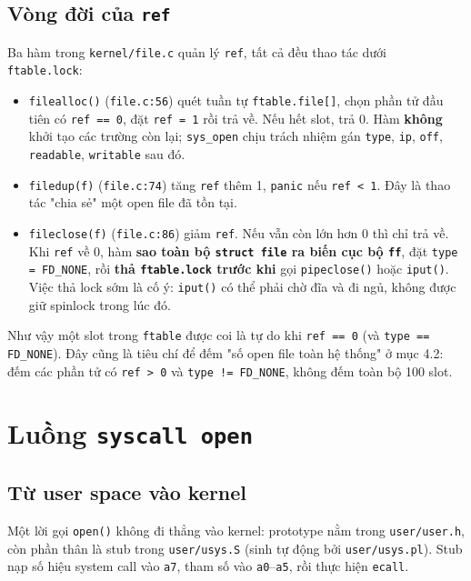 \subsection{Vòng đời của \texttt{ref}}

Ba hàm trong \texttt{kernel/file.c} quản lý \texttt{ref}, tất cả đều thao tác dưới \texttt{ftable.lock}:

\begin{itemize}[topsep=0pt, itemsep=2.5pt, leftmargin=1.5cm]
    \item \texttt{filealloc()} (\texttt{file.c:56}) quét tuần tự \texttt{ftable.file[]}, chọn phần tử đầu tiên có \texttt{ref == 0}, đặt \texttt{ref = 1} rồi trả về. Nếu hết slot, trả 0. Hàm \textbf{không} khởi tạo các trường còn lại; \texttt{sys\_open} chịu trách nhiệm gán \texttt{type}, \texttt{ip}, \texttt{off}, \texttt{readable}, \texttt{writable} sau đó.
    \item \texttt{filedup(f)} (\texttt{file.c:74}) tăng \texttt{ref} thêm 1, \texttt{panic} nếu \texttt{ref < 1}. Đây là thao tác "chia sẻ" một open file đã tồn tại.
    \item \texttt{fileclose(f)} (\texttt{file.c:86}) giảm \texttt{ref}. Nếu vẫn còn lớn hơn 0 thì chỉ trả về. Khi \texttt{ref} về 0, hàm \textbf{sao toàn bộ \texttt{struct file} ra biến cục bộ \texttt{ff}}, đặt \texttt{type = FD\_NONE}, rồi \textbf{thả \texttt{ftable.lock} trước khi} gọi \texttt{pipeclose()} hoặc \texttt{iput()}. Việc thả lock sớm là cố ý: \texttt{iput()} có thể phải chờ đĩa và đi ngủ, không được giữ spinlock trong lúc đó.
\end{itemize}

Như vậy một slot trong \texttt{ftable} được coi là tự do khi \texttt{ref == 0} (và \texttt{type == FD\_NONE}). Đây cũng là tiêu chí để đếm "số open file toàn hệ thống" ở mục 4.2: đếm các phần tử có \texttt{ref > 0} và \texttt{type != FD\_NONE}, không đếm toàn bộ 100 slot.

\section{Luồng \texttt{syscall open}}

\subsection{Từ user space vào kernel}

Một lời gọi \texttt{open()} không đi thẳng vào kernel: prototype nằm trong \texttt{user/user.h}, còn phần thân là stub trong \texttt{user/usys.S} (sinh tự động bởi \texttt{user/usys.pl}). Stub nạp số hiệu system call vào \texttt{a7}, tham số vào \texttt{a0}–\texttt{a5}, rồi thực hiện \texttt{ecall}.


